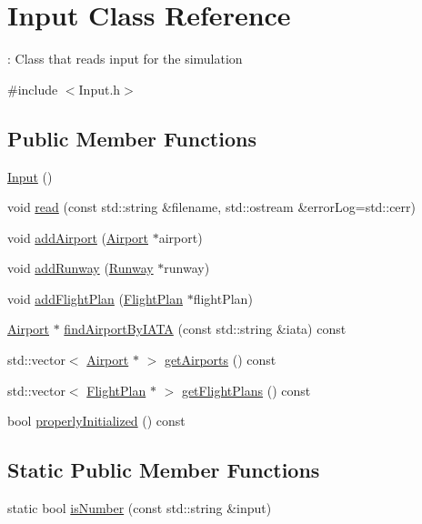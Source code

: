 \hypertarget{classInput}{}\section{Input Class Reference}
\label{classInput}


\+: Class that reads input for the simulation  




{\ttfamily \#include $<$Input.\+h$>$}

\subsection*{Public Member Functions}
\begin{DoxyCompactItemize}
\item 
\hyperlink{classInput_abae3f379d3f157cf42dc857309832dba}{Input} ()
\item 
void \hyperlink{classInput_a4e7a85f7ff15607788c2e0c6409f82d0}{read} (const std\+::string \&filename, std\+::ostream \&error\+Log=std\+::cerr)
\item 
void \hyperlink{classInput_adf2ec48d79d704c139f9a2ab295f8d21}{add\+Airport} (\hyperlink{classAirport}{Airport} $\ast$airport)
\item 
void \hyperlink{classInput_a047b280ecbd65bf8be570aba4f07f440}{add\+Runway} (\hyperlink{classRunway}{Runway} $\ast$runway)
\item 
void \hyperlink{classInput_a84b18ed00656a295b8f926835e26ec12}{add\+Flight\+Plan} (\hyperlink{classFlightPlan}{Flight\+Plan} $\ast$flight\+Plan)
\item 
\hyperlink{classAirport}{Airport} $\ast$ \hyperlink{classInput_a475edc715eaefa762cf93d169efede18}{find\+Airport\+By\+I\+A\+TA} (const std\+::string \&iata) const 
\item 
std\+::vector$<$ \hyperlink{classAirport}{Airport} $\ast$ $>$ \hyperlink{classInput_aa1f634b15684092240be80cb17dd28ec}{get\+Airports} () const 
\item 
std\+::vector$<$ \hyperlink{classFlightPlan}{Flight\+Plan} $\ast$ $>$ \hyperlink{classInput_ae0e8c45a0220d4eb8b7390c5093344cf}{get\+Flight\+Plans} () const 
\item 
bool \hyperlink{classInput_a42a0d1fd763cb2814cefe27b144ae0bb}{properly\+Initialized} () const 
\end{DoxyCompactItemize}
\subsection*{Static Public Member Functions}
\begin{DoxyCompactItemize}
\item 
static bool \hyperlink{classInput_a8a7b004a197f7bb50b8e41e4e7dc853e}{is\+Number} (const std\+::string \&input)
\end{DoxyCompactItemize}


